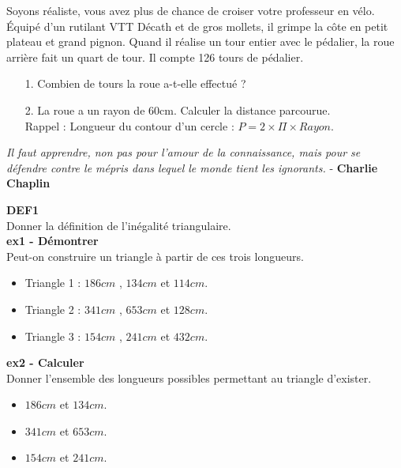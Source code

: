 Soyons réaliste, vous avez plus de chance de croiser votre professeur en vélo. Équipé d'un rutilant VTT Décath et de gros mollets, il grimpe la côte en petit plateau et grand pignon. Quand il réalise un tour entier avec le pédalier, la roue arrière fait un quart de tour. Il compte 126 tours de pédalier. 

\begin{enumerate}
  \item[1.] Combien de tours la roue a-t-elle effectué ?
  \item[2.] La roue a un rayon de 60cm. Calculer la distance parcourue. \\
    Rappel : Longueur du contour d'un cercle : $P = 2 \times \Pi \times Rayon$.   
\end{enumerate}

\newpage


\begin{center}
  \textit{Il faut apprendre, non pas pour l'amour de la connaissance, mais pour se défendre contre le mépris dans lequel le monde tient les ignorants.} - \textbf{Charlie Chaplin}
\end{center}

\textbf{DEF1} \\

Donner la définition de l'inégalité triangulaire.\\

\textbf{ex1 - Démontrer} \\

Peut-on construire un triangle à partir de ces trois longueurs.

\begin{itemize}[label={$\bullet$}]
  \item Triangle 1 : $186cm$ , $134cm$  et $114cm$.
  \item Triangle 2 : $341cm$ , $653cm$ et $128cm$.
  \item Triangle 3 : $154cm$ , $241cm$ et $432cm$.
\end{itemize} 

\textbf{ex2 - Calculer} \\

Donner l'ensemble des longueurs possibles permettant au triangle d'exister. 

\begin{itemize}[label={$\bullet$}]
  \item $186cm$ et $134cm$.
  \item $341cm$ et $653cm$.
  \item $154cm$ et $241cm$.
\end{itemize}


